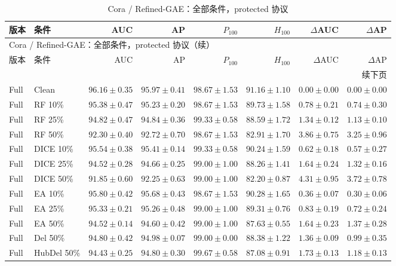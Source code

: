 {\footnotesize
\setlength{\tabcolsep}{3.2pt}
\renewcommand{\arraystretch}{1.10}
\begin{longtable}{llrrrrrr}
\caption{Cora / Refined-GAE：全部条件，protected 协议}\\
\toprule
版本 & 条件 & AUC & AP & $P_{100}$ & $H_{100}$ & $\Delta$AUC & $\Delta$AP \\
\midrule
\endfirsthead
\multicolumn{8}{l}{Cora / Refined-GAE：全部条件，protected 协议（续）}\\
\toprule
版本 & 条件 & AUC & AP & $P_{100}$ & $H_{100}$ & $\Delta$AUC & $\Delta$AP \\
\midrule
\endhead
\midrule\multicolumn{8}{r}{续下页}\\
\endfoot
\bottomrule
\endlastfoot
Full & Clean & $96.16\pm0.35$ & $95.97\pm0.41$ & $98.67\pm1.53$ & $91.16\pm1.10$ & $0.00\pm0.00$ & $0.00\pm0.00$ \\
Full & RF 10\% & $95.38\pm0.47$ & $95.23\pm0.20$ & $98.67\pm1.53$ & $89.73\pm1.58$ & $0.78\pm0.21$ & $0.74\pm0.30$ \\
Full & RF 25\% & $94.82\pm0.47$ & $94.84\pm0.36$ & $99.33\pm0.58$ & $88.59\pm1.72$ & $1.34\pm0.12$ & $1.13\pm0.10$ \\
Full & RF 50\% & $92.30\pm0.40$ & $92.72\pm0.70$ & $98.67\pm1.53$ & $82.91\pm1.70$ & $3.86\pm0.75$ & $3.25\pm0.96$ \\
Full & DICE 10\% & $95.54\pm0.38$ & $95.41\pm0.14$ & $99.33\pm0.58$ & $90.24\pm1.59$ & $0.62\pm0.18$ & $0.57\pm0.27$ \\
Full & DICE 25\% & $94.52\pm0.28$ & $94.66\pm0.25$ & $99.00\pm1.00$ & $88.26\pm1.41$ & $1.64\pm0.24$ & $1.32\pm0.16$ \\
Full & DICE 50\% & $91.85\pm0.60$ & $92.25\pm0.63$ & $99.00\pm1.00$ & $82.20\pm0.87$ & $4.31\pm0.95$ & $3.72\pm0.78$ \\
Full & EA 10\% & $95.80\pm0.42$ & $95.68\pm0.43$ & $98.67\pm1.53$ & $90.28\pm1.65$ & $0.36\pm0.07$ & $0.30\pm0.06$ \\
Full & EA 25\% & $95.33\pm0.21$ & $95.26\pm0.48$ & $99.00\pm1.00$ & $89.31\pm0.76$ & $0.83\pm0.19$ & $0.72\pm0.24$ \\
Full & EA 50\% & $94.52\pm0.14$ & $94.60\pm0.42$ & $99.00\pm1.00$ & $87.63\pm0.55$ & $1.64\pm0.23$ & $1.37\pm0.28$ \\
Full & Del 50\% & $94.80\pm0.42$ & $94.98\pm0.07$ & $99.00\pm0.00$ & $88.38\pm1.22$ & $1.36\pm0.09$ & $0.99\pm0.35$ \\
Full & HubDel 50\% & $94.43\pm0.25$ & $94.80\pm0.30$ & $99.67\pm0.58$ & $87.08\pm0.91$ & $1.73\pm0.13$ & $1.18\pm0.13$ \\

\end{longtable}}
